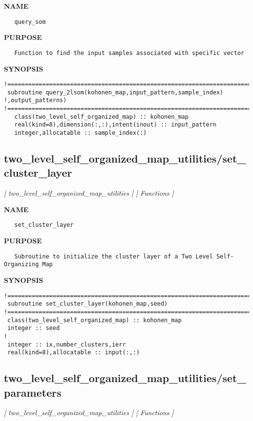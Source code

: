 \documentclass{article}
\begin{document}
\label{ch:robo75}
\label{ch:two_level_self_organized_map_utilities_query_som}
\textbf{NAME}
\begin{verbatim}
   query_som
\end{verbatim}
\textbf{PURPOSE}
\begin{verbatim}
   Function to find the input samples associated with specific vector 
\end{verbatim}
\textbf{SYNOPSIS}
\begin{verbatim}
!========================================================================================
 subroutine query_2lsom(kohonen_map,input_pattern,sample_index) !,output_patterns)
!========================================================================================
   class(two_level_self_organized_map) :: kohonen_map
   real(kind=8),dimension(:,:),intent(inout) :: input_pattern
   integer,allocatable :: sample_index(:)
\end{verbatim}
\newpage
\subsection{two\_level\_self\_organized\_map\_utilities/set\_cluster\_layer}
\textsl{[ two\_level\_self\_organized\_map\_utilities ]}
\textsl{[ Functions ]}

\label{ch:robo76}
\label{ch:two_level_self_organized_map_utilities_set_cluster_layer}
\textbf{NAME}
\begin{verbatim}
   set_cluster_layer
\end{verbatim}
\textbf{PURPOSE}
\begin{verbatim}
   Subroutine to initialize the cluster layer of a Two Level Self-Organizing Map
\end{verbatim}
\textbf{SYNOPSIS}
\begin{verbatim}
!========================================================================================  
 subroutine set_cluster_layer(kohonen_map,seed)
!========================================================================================  
 class(two_level_self_organized_map) :: kohonen_map
 integer :: seed
!
 integer :: ix,number_clusters,ierr
 real(kind=8),allocatable :: input(:,:)
\end{verbatim}
\newpage
\subsection{two\_level\_self\_organized\_map\_utilities/set\_parameters}
\textsl{[ two\_level\_self\_organized\_map\_utilities ]}
\textsl{[ Functions ]}
\end{document}
